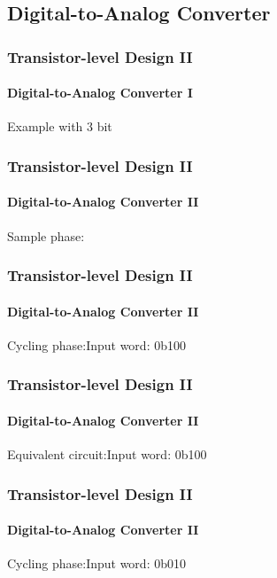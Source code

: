 \documentclass{beamer}
\begin{document}
  \subsection{Digital-to-Analog Converter}
  \begin{frame}
    \frametitle{Transistor-level Design II}
    \framesubtitle{Digital-to-Analog Converter I}
    Example with 3 bit\vspace*{1em}
    \begin{center}
    \resizebox{\textwidth}{!}{}
    \end{center}
  \end{frame}

  \begin{frame}
    \frametitle{Transistor-level Design II}
    \framesubtitle{Digital-to-Analog Converter II}
    Sample phase:
    \vspace*{1em}
    \begin{center}
    
    \end{center}
  \end{frame}

  \begin{frame}
    \frametitle{Transistor-level Design II}
    \framesubtitle{Digital-to-Analog Converter II}
    Cycling phase:\hfill Input word: \alert{0b100}
    \vspace*{1em}
    \begin{center}
    
    \end{center}
  \end{frame}

  \begin{frame}
    \frametitle{Transistor-level Design II}
    \framesubtitle{Digital-to-Analog Converter II}
    Equivalent circuit:\hfill Input word: \alert{0b100}
    \vspace*{1em}
    \begin{center}
    
    \end{center}
  \end{frame}

  \begin{frame}
    \frametitle{Transistor-level Design II}
    \framesubtitle{Digital-to-Analog Converter II}
    Cycling phase:\hfill Input word: \alert{0b010}
    \vspace*{1em}
    \begin{center}
    
    \end{center}
  \end{frame}
\end{document}
